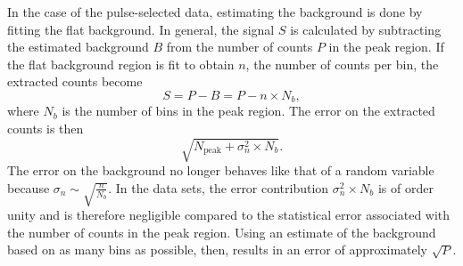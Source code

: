 In the case of the pulse-selected data, estimating the background is done by fitting the flat background.  In general, the signal $S$ is calculated by subtracting the estimated background $B$ from the number of counts $P$ in the peak region.  If the flat background region is fit to obtain $n$, the number of counts per bin, the extracted counts become
\begin{equation}
S = P - B = P - n\times N_b,
\end{equation}
where $N_b$ is the number of bins in the peak region.  The error on the extracted counts is then
\begin{equation}
\sqrt{N_{\text{peak}} + {\sigma}_n^2\times N_b}.
\end{equation}
The error on the background no longer behaves like that of a random variable because $\sigma_n\sim\sqrt{\frac{n}{N_b}}$.  In the \reaction data sets, the error contribution ${\sigma}_n^2\times N_b$ is of order unity and is therefore negligible compared to the statistical error associated with the number of counts in the peak region.  Using an estimate of the background based on as many bins as possible, then, results in an error of approximately $\sqrt{P}$.

